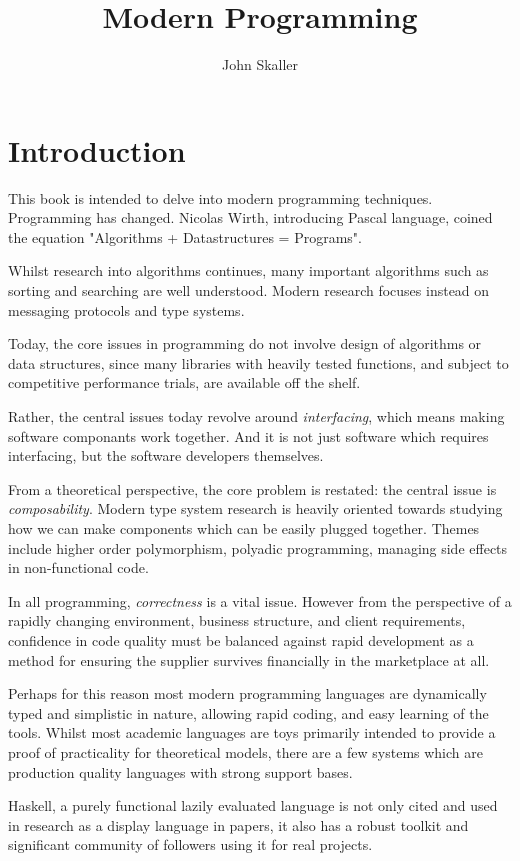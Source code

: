 \documentclass[oneside]{book}
\title{Modern Programming}
\author{John Skaller}
\begin{document}
\maketitle
\tableofcontents
\chapter{Introduction}
This book is intended to delve into modern programming techniques.
Programming has changed. Nicolas Wirth, introducing Pascal language,
coined the equation "Algorithms + Datastructures = Programs".

Whilst research into algorithms continues, many important
algorithms such as sorting and searching are well understood.
Modern research focuses instead on messaging protocols
and type systems.

Today, the core issues in programming do not involve design
of algorithms or data structures, since many libraries with
heavily tested functions, and subject to competitive performance
trials, are available off the shelf.

Rather, the central issues today revolve around {\em interfacing},
which means making software componants work together. And it is
not just software which requires interfacing, but the software
developers themselves.

From a theoretical perspective, the core problem is restated:
the central issue is {\em composability}. Modern type system
research is heavily oriented towards studying how we can
make components which can be easily plugged together.
Themes include higher order polymorphism, polyadic programming,
managing side effects in non-functional code.

In all programming, {\em correctness} is a vital issue.
However from the perspective of a rapidly changing
environment, business structure, and client requirements,
confidence in code quality must be balanced against
rapid development as a method for ensuring the supplier
survives financially in the marketplace at all.

Perhaps for this reason most modern programming languages
are dynamically typed and simplistic in nature, allowing
rapid coding, and easy learning of the tools. Whilst most
academic languages are toys primarily intended to provide
a proof of practicality for theoretical models, there are
a few systems which are production quality languages with
strong support bases.

Haskell, a purely functional lazily evaluated language
is not only cited and used in research as a display
language in papers, it also has a robust toolkit
and significant community of followers using it for
real projects.
\end{document}
